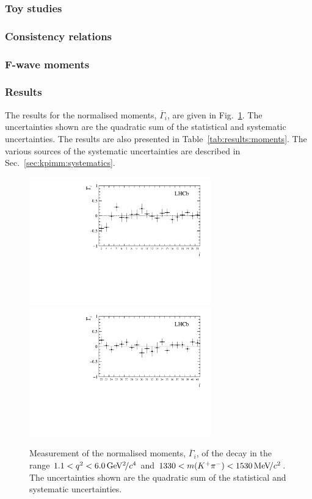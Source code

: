 \subsubsection{Toy studies}

\subsubsection{Consistency relations}

\subsubsection{F-wave moments}

\subsubsection{Results}

The results for the normalised moments, $\overline{\Gamma}_{i}$, are given in Fig.~\ref{fig:results:moments}. The uncertainties shown are the quadratic sum of the statistical and systematic uncertainties. The results are also presented in Table~\ref{tab:results:moments}. The various sources of the systematic uncertainties are described in Sec.~\ref{sec:kpimm:systematics}.

\begin{figure}[!tb]
\centering
  \includegraphics[width=0.7\textwidth]{figs/kpimm/angular-analysis/mom_results_2_21.pdf}
  \includegraphics[width=0.7\textwidth]{figs/kpimm/angular-analysis/mom_results_22_41.pdf}
  \caption{Measurement of the normalised moments, $\overline{\Gamma}_{i}$, of the decay \BdToKpimm in the range $1.1<{q^2}<6.0{\mathrm{\,Ge\kern -0.1em V^2\!/}c^4}$ and $1330<m({{K}^+}{{\pi}^-})<1530{\mathrm{\,Me\kern -0.1em V\!/}c^2}$. The uncertainties shown are the quadratic sum of the statistical and systematic uncertainties.}
  \label{fig:results:moments}
\end{figure}

